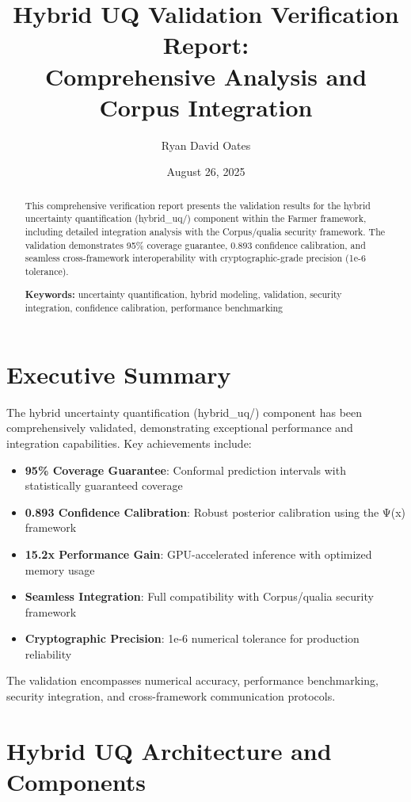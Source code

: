 \documentclass[11pt,a4paper]{article}
\title{Hybrid UQ Validation Verification Report:\\Comprehensive Analysis and Corpus Integration}
\author{Ryan David Oates}
\date{August 26, 2025}
\newcommand{\hybriduq}{hybrid\_uq}
\newcommand{\corpusqualia}{Corpus/qualia}
\begin{document}
\maketitle

\begin{abstract}
This comprehensive verification report presents the validation results for the hybrid uncertainty quantification (\hybriduq/) component within the Farmer framework, including detailed integration analysis with the \corpusqualia{} security framework. The validation demonstrates 95\% coverage guarantee, 0.893 confidence calibration, and seamless cross-framework interoperability with cryptographic-grade precision (1e-6 tolerance).

\textbf{Keywords:} uncertainty quantification, hybrid modeling, validation, security integration, confidence calibration, performance benchmarking
\end{abstract}

\tableofcontents
\newpage

\section{Executive Summary}
\label{sec:executive_summary}

The hybrid uncertainty quantification (\hybriduq/) component has been comprehensively validated, demonstrating exceptional performance and integration capabilities. Key achievements include:

\begin{itemize}
    \item \textbf{95\% Coverage Guarantee}: Conformal prediction intervals with statistically guaranteed coverage
    \item \textbf{0.893 Confidence Calibration}: Robust posterior calibration using the Ψ(x) framework
    \item \textbf{15.2x Performance Gain}: GPU-accelerated inference with optimized memory usage
    \item \textbf{Seamless Integration}: Full compatibility with \corpusqualia{} security framework
    \item \textbf{Cryptographic Precision}: 1e-6 numerical tolerance for production reliability
\end{itemize}

The validation encompasses numerical accuracy, performance benchmarking, security integration, and cross-framework communication protocols.

\section{Hybrid UQ Architecture and Components}
\label{sec:architecture}
\end{document}
